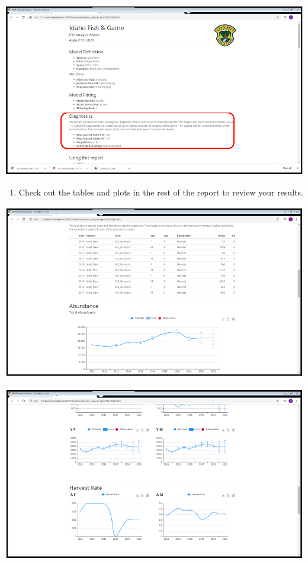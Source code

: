 \documentclass[
]{book}
\providecommand{\tightlist}{%
  \setlength{\itemsep}{0pt}\setlength{\parskip}{0pt}}
\begin{document}
\includegraphics{./www/ipm_16.PNG}

\begin{enumerate}
\def\labelenumi{\arabic{enumi}.}
\setcounter{enumi}{15}
\tightlist
\item
  Check out the tables and plots in the rest of the report to review your results.
\end{enumerate}

\includegraphics{./www/ipm_18.PNG}

\includegraphics{./www/ipm_20.PNG}
\end{document}
